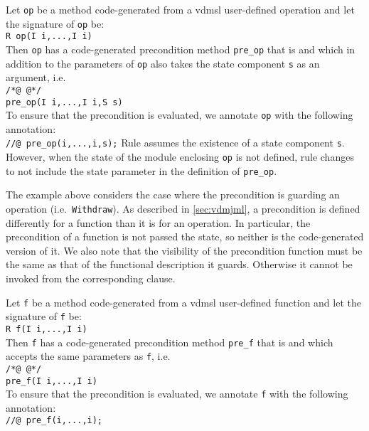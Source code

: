  {
  Let \texttt{op} be a method code-generated from a \ac{vdmsl} user-defined operation and let the signature of \texttt{op} be:\\
   \texttt{R op(I i,...,I i)}\\
  Then \texttt{op} has a code-generated precondition method \texttt{pre\_op} that is  and which in addition to the
  pa\-ra\-met\-ers of \texttt{op} also takes the state component \texttt{s} as an argument, i.e.\ \\
  \texttt{/*@  @*/}  \texttt{ \\
    pre\_op(I i,...,I i,S s)}\\
  To ensure that the precondition is evaluated, we annotate \texttt{op} with the following  annotation:\\
  \texttt{//@  pre\_op(i,...,i,s);}}
%
%
Rule  assumes the existence of a state component
\texttt{s}. However, when the state of the module enclosing
\texttt{op} is not defined, rule  changes to not include
the state parameter in the definition of \texttt{pre\_op}.

The example above considers the case where the precondition is
guarding an operation (i.e.\ \texttt{Withdraw}). As described in
\autoref{sec:vdmjml}, a precondition is defined differently for a
function than it is for an operation. In particular, the precondition
of a function is not passed the state, so neither is the
code-generated version of it. We also note that the visibility of the
precondition function must be the same as that of the functional
description it guards. Otherwise it cannot be invoked from the
corresponding  clause.

 {
  Let \texttt{f} be a method code-generated from a \ac{vdmsl} user-defined function and let the signature of \texttt{f} be:\\
   \texttt{R f(I i,...,I i)}\\
  Then \texttt{f} has a code-generated precondition method
  \texttt{pre\_f} that is  and which accepts the same parameters as \texttt{f}, i.e.\ \\
  \texttt{/*@  @*/}  \texttt{ \\
    pre\_f(I i,...,I i)}\\
  To ensure that the precondition is evaluated, we annotate \texttt{f} with the following  annotation:\\
  \texttt{//@  pre\_f(i,...,i);}}
  
